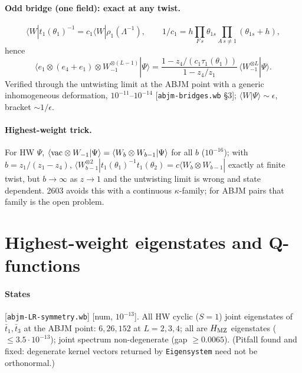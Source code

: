 \documentclass[11pt]{article}
\newcommand{\tb}{\bar t}
\newcommand{\HMZ}{H_{\rm MZ}}
\newcommand{\nb}[1]{\texttt{#1}}
\newcommand{\num}[1]{\textsf{[num, $#1$]}}
\newcommand{\bra}[1]{\langle#1|}
\begin{document}
\paragraph{Odd bridge (one field): exact at any twist.}
\[
 \bra Wt_1(\theta_1)^{-1}=c_1\bra W\rho_1(\Lambda^{-1}),\qquad
 1/c_1=h\prod_{F\,s}\theta_{1s}\prod_{A\,s\ne1}(\theta_{1s}+h),
\]
hence
\begin{equation}
 \langle e_1\otimes(e_4+e_1)\otimes W_{-1}^{\otimes(L-1)}|\Psi\rangle=
 \frac{1-z_4/(c_1\tau_1(\theta_1))}{1-z_4/z_1}\,\langle W_{-1}^{\otimes L}|\Psi\rangle.
\end{equation}
Verified through the untwisting limit at the ABJM point with a generic inhomogeneous deformation,
$10^{-11}$--$10^{-14}$ [\nb{abjm-bridges.wb} \S3]; $\bra W\Psi\rangle\sim\epsilon$, bracket $\sim1/\epsilon$.

\paragraph{Highest-weight trick.} For HW $\Psi$, $\langle{\rm vac}\otimes W_{-1}|\Psi\rangle=\langle W_b\otimes W_{b-1}|\Psi\rangle$
for all $b$ ($10^{-16}$); with $b=z_1/(z_1-z_4)$, $\bra{W_{b-1}^{\otimes2}}t_1(\theta_1)^{-1}t_1(\theta_2)=c\bra{W_b\otimes W_{b-1}}$
exactly at finite twist, but $b\to\infty$ as $z\to1$ and the untwisting limit is wrong and state dependent. 2603 avoids
this with a continuous $\kappa$-family; for ABJM pairs that family is the open problem.

\section{Highest-weight eigenstates and Q-functions}\label{sec:states}

\paragraph{States} [\nb{abjm-LR-symmetry.wb}] \num{10^{-13}}. All HW cyclic ($S=1$) joint eigenstates of $\tb_1,\tb_3$ at
the ABJM point: $6,26,152$ at $L=2,3,4$; all are $\HMZ$ eigenstates ($\le3.5\cdot10^{-13}$); joint spectrum non-degenerate
(gap $\ge0.0065$). (Pitfall found and fixed: degenerate kernel vectors returned by \nb{Eigensystem} need not be
orthonormal.)
\end{document}
